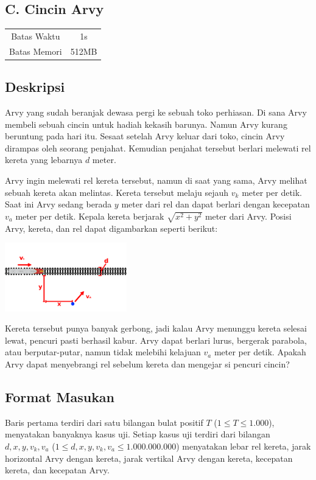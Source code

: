 \documentclass{article}
\begin{document}
\begin{center}
    \section*{C. Cincin Arvy}

    \begin{tabular}{ | c c | }
        \hline
        Batas Waktu  & 1s \\
        Batas Memori & 512MB \\
        \hline
    \end{tabular}
\end{center}

\subsection*{Deskripsi}

Arvy yang sudah beranjak dewasa pergi ke sebuah toko perhiasan.
Di sana Arvy membeli sebuah cincin untuk hadiah kekasih barunya.
Namun Arvy kurang beruntung pada hari itu.
Sesaat setelah Arvy keluar dari toko, cincin Arvy dirampas oleh seorang penjahat.
Kemudian penjahat tersebut berlari melewati rel kereta yang lebarnya $d$ meter.

Arvy ingin melewati rel kereta tersebut, namun di saat yang sama, Arvy melihat sebuah kereta akan melintas.
Kereta tersebut melaju sejauh $v_k$ meter per detik.
Saat ini Arvy sedang berada $y$ meter dari rel dan dapat berlari dengan kecepatan $v_a$ meter per detik.
Kepala kereta berjarak $\sqrt{x^2+y^2}$ meter dari Arvy.
Posisi Arvy, kereta, dan rel dapat digambarkan seperti berikut:

\begin{center}
    \includegraphics[width=200px]{skema}
\end{center}

Kereta tersebut punya banyak gerbong, jadi kalau Arvy menunggu kereta selesai lewat, pencuri pasti berhasil kabur.
Arvy dapat berlari lurus, bergerak parabola, atau berputar-putar, namun tidak melebihi kelajuan $v_a$ meter per detik.
Apakah Arvy dapat menyebrangi rel sebelum kereta dan mengejar si pencuri cincin?

\subsection*{Format Masukan}
Baris pertama terdiri dari satu bilangan bulat positif $T$ ($1 \leq T \leq 1.000$), menyatakan banyaknya kasus uji.
Setiap kasus uji terdiri dari bilangan $d, x, y, v_k, v_a$ ($1 \leq d, x, y, v_k, v_a \leq 1.000.000.000$) menyatakan lebar rel kereta, jarak horizontal Arvy dengan kereta, jarak vertikal Arvy dengan kereta, kecepatan kereta, dan kecepatan Arvy.
\end{document}
